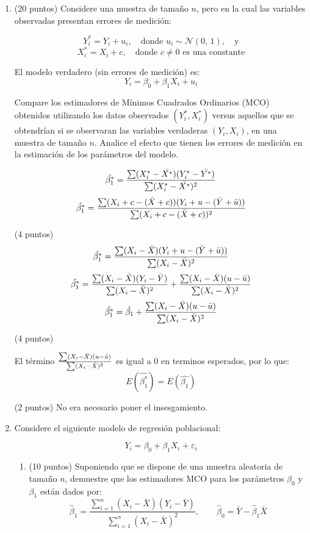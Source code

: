 \documentclass[10pt,a4paper]{article}
\begin{document}
\begin{enumerate}
\item (20 puntos) Considere una muestra de tamaño \( n \), pero en la cual las variables observadas presentan errores de medición:

\[
Y_i^* = Y_i + u_i, \quad \text{donde } u_i \sim \mathcal{N}(0,\,1), \quad \text{y}
\]
\[
X_i^* = X_i + c, \quad \text{donde } c \neq 0 \text{ es una constante}
\]

El modelo verdadero (sin errores de medición) es:
\[
Y_i = \beta_0 + \beta_1 X_i + u_i
\]

Compare los estimadores de Mínimos Cuadrados Ordinarios (MCO) obtenidos utilizando los datos observados \((Y_i^*, X_i^*)\) versus aquellos que se obtendrían si se observaran las variables verdaderas \((Y_i, X_i)\), en una muestra de tamaño \( n \). Analice el efecto que tienen los errores de medición en la estimación de los parámetros del modelo.

{\color{blue}
$$\hat{\beta_1^*} = \frac{\sum (X_i^*-\Bar{X^*})(Y_i^*-\Bar{Y^*})}{\sum (X_i^*-\Bar{X^*})^2}$$
$$\hat{\beta_1^*} = \frac{\sum (X_i+c-(\Bar{X}+c))(Y_i+u-(\Bar{Y}+\Bar{u}))}{\sum (X_i+c-(\Bar{X}+c))^2}$$

(4 puntos)
$$\hat{\beta_1^*} = \frac{\sum (X_i-\Bar{X})(Y_i+u-(\Bar{Y}+\Bar{u}))}{\sum (X_i-\Bar{X})^2}$$
$$\hat{\beta_1^*} = \frac{\sum (X_i-\Bar{X})(Y_i-\Bar{Y})}{\sum (X_i-\Bar{X})^2} + \frac{\sum (X_i-\Bar{X})(u-\Bar{u})}{\sum (X_i-\Bar{X})^2}$$
$$\hat{\beta_1^*} = \hat{\beta_1} + \frac{\sum (X_i-\Bar{X})(u-\Bar{u})}{\sum (X_i-\Bar{X})^2}$$

(4 puntos)

El t\'ermino $\frac{\sum (X_i-\Bar{X})(u-\Bar{u})}{\sum (X_i-\Bar{X})^2}$ es igual a 0 en terminos esperados, por lo que:
 $$E(\hat{\beta_1^*}) = E(\hat{\beta_1})$$

 (2 puntos) No era necesario poner el insesgamiento.
}


\item Considere el siguiente modelo de regresión poblacional:

\[
Y_i = \beta_0 + \beta_1 X_i + \varepsilon_i
\]

\begin{enumerate}
    \item[(a)] (10 puntos) Suponiendo que se dispone de una muestra aleatoria de tamaño \( n \), demuestre que los estimadores  MCO para los parámetros \( \beta_0 \) y \( \beta_1 \) están dados por:
    \[
    \hat{\beta}_1 = \frac{\sum_{i=1}^{n}(X_i - \bar{X})(Y_i - \bar{Y})}{\sum_{i=1}^{n}(X_i - \bar{X})^2}, \qquad
    \hat{\beta}_0 = \bar{Y} - \hat{\beta}_1 \bar{X}
    \]


\end{enumerate}
\end{enumerate}
\end{document}
